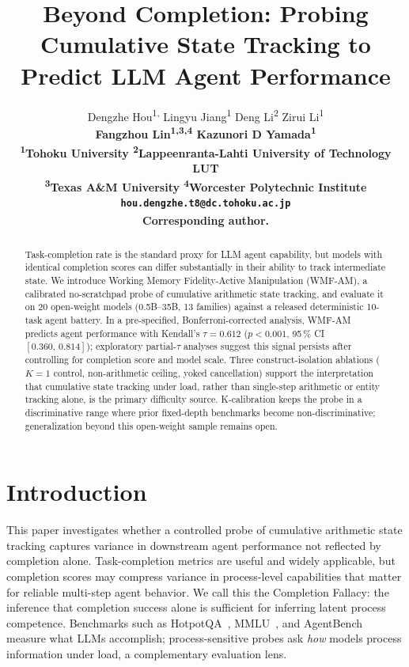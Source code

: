 \documentclass{article}
\title{Beyond Completion: Probing Cumulative State Tracking to Predict LLM Agent Performance}
\author{%
  Dengzhe Hou\textsuperscript{1,\dag}\hspace{1.5em}
  Lingyu Jiang\textsuperscript{1}\hspace{1.5em}
  Deng Li\textsuperscript{2}\hspace{1.5em}
  Zirui Li\textsuperscript{1}\\[2pt]
  \bf Fangzhou Lin\textsuperscript{1,3,4}\hspace{1.5em}
  Kazunori D Yamada\textsuperscript{1}\\[6pt]
  \normalfont\textsuperscript{1}Tohoku University\hspace{1em}
  \textsuperscript{2}Lappeenranta-Lahti University of Technology LUT\\[1pt]
  \textsuperscript{3}Texas A\&M University\hspace{1em}
  \textsuperscript{4}Worcester Polytechnic Institute\\[2pt]
  {\small \texttt{hou.dengzhe.t8@dc.tohoku.ac.jp}}\\[1pt]
  {\small \textsuperscript{\dag}Corresponding author.}
}
\date{}
\begin{document}
\maketitle

\begin{abstract}
Task-completion rate is the standard proxy for LLM agent capability,
but models with identical completion scores can differ substantially
in their ability to track intermediate state. We introduce Working Memory Fidelity-Active Manipulation (WMF-AM), a calibrated no-scratchpad probe of cumulative arithmetic state tracking, and evaluate it on 20 open-weight models (0.5B--35B, 13 families) against a released deterministic 10-task agent battery. In a pre-specified, Bonferroni-corrected analysis, WMF-AM predicts agent performance with Kendall's $\tau{=}0.612$ ($p{<}0.001$, 95\,\% CI $[0.360,\,0.814]$); exploratory partial-$\tau$ analyses suggest this signal persists after controlling for completion score and model scale. Three construct-isolation ablations ($K{=}1$ control, non-arithmetic ceiling, yoked cancellation) support the interpretation that cumulative state tracking under load, rather than single-step arithmetic or entity tracking alone, is the primary difficulty source. K-calibration keeps the probe in a discriminative range where prior fixed-depth benchmarks become non-discriminative; generalization beyond this open-weight sample remains open.
\end{abstract}

\section{Introduction}
\label{sec:intro}

This paper investigates whether a controlled probe of cumulative arithmetic state tracking captures variance in downstream agent performance not reflected by completion alone. Task-completion metrics are useful and widely applicable, but completion scores may compress variance in process-level capabilities that matter for reliable multi-step agent behavior. We call this the Completion Fallacy: the inference that completion success alone is sufficient for inferring latent process competence. Benchmarks such as HotpotQA~\citep{yang2018hotpotqa},
MMLU~\citep{hendrycks2021mmlu}, and AgentBench~\citep{liu2023agentbench}
measure what LLMs accomplish; process-sensitive probes ask \emph{how} models process information under load, a complementary evaluation lens.
\end{document}
